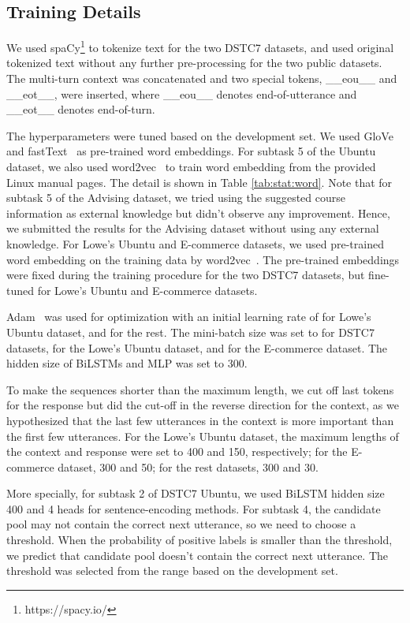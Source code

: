 \documentclass[letterpaper]{article} \usepackage{aaai19}  \usepackage{times}  \usepackage{helvet}  \usepackage{courier}  \usepackage{url}  \usepackage{graphicx}
\begin{document}
\subsection{Training Details}
We used spaCy\footnote{https://spacy.io/} to tokenize text for the two DSTC7 datasets, and used original tokenized text without any further pre-processing for the two public datasets. The multi-turn context was concatenated and two special tokens, \_\_eou\_\_ and \_\_eot\_\_, were inserted, where \_\_eou\_\_ denotes end-of-utterance and \_\_eot\_\_ denotes end-of-turn. 

The hyperparameters were tuned based on the development set.
We used GloVe~\cite{DBLP:conf/emnlp/PenningtonSM14} and fastText~\cite{DBLP:conf/lrec/MikolovGBPJ18} as pre-trained word embeddings. For subtask 5 of the Ubuntu dataset, we also used word2vec~\cite{DBLP:conf/nips/MikolovSCCD13} to train word embedding from the provided Linux manual pages. The detail is shown in Table \ref{tab:stat:word}. 
Note that for subtask 5 of the Advising dataset, we tried using the suggested course information as external knowledge but didn't observe any improvement. Hence, we submitted the results for the Advising dataset without using any external knowledge. 
For Lowe's Ubuntu and E-commerce datasets, we used pre-trained word embedding on the training data by word2vec~\cite{DBLP:conf/nips/MikolovSCCD13}. 
The pre-trained embeddings were fixed during the training procedure for the two DSTC7 datasets, but fine-tuned for Lowe's Ubuntu and E-commerce datasets. 

Adam~\cite{DBLP:journals/corr/KingmaB14} was used for optimization with an initial learning rate of  for Lowe's Ubuntu dataset, and  for the rest. The mini-batch size was set to  for DSTC7 datasets,  for the Lowe's Ubuntu dataset, and  for the E-commerce dataset. The hidden size of BiLSTMs and MLP was set to 300.

To make the sequences shorter than the maximum length, we cut off last tokens for the response but did the cut-off in the reverse direction for the context, as we hypothesized that the last few utterances in the context is more important than the first few utterances.
For the Lowe's Ubuntu dataset, the maximum lengths of the context and response were set to 400 and 150, respectively; for the E-commerce dataset, 300 and 50; for the rest datasets, 300 and 30. 

More specially, for subtask 2 of DSTC7 Ubuntu, we used BiLSTM hidden size 400 and 4 heads for sentence-encoding methods. For subtask 4, the candidate pool may not contain the correct next utterance, so we need to choose a threshold. When the probability of positive labels is smaller than the threshold, we predict that candidate pool doesn't contain the correct next utterance. The threshold was selected from the range  based on the development set. 
\end{document}
